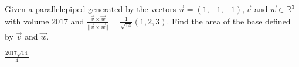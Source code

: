
\begin{Exercise}[
name={},
title={}, 
difficulty=0,
origin={\cite{YL}}]
Given a parallelepiped generated by the vectors $\vec{u}=(1, -1, -1), \vec{v}$ and $\vec{w}\in \mathbb{R}^3$ with volume $2017$ and $\frac{\vec{v}\times\vec{w}}{||\vec{v}\times\vec{w}||}=\frac{1}{\sqrt{14}}(1,2,3)$.  Find the area of the base defined by $\vec{v}$ and $\vec{w}$.
\end{Exercise}

\begin{Answer}
$\frac{2017\sqrt{14}}{4}$
\end{Answer}
